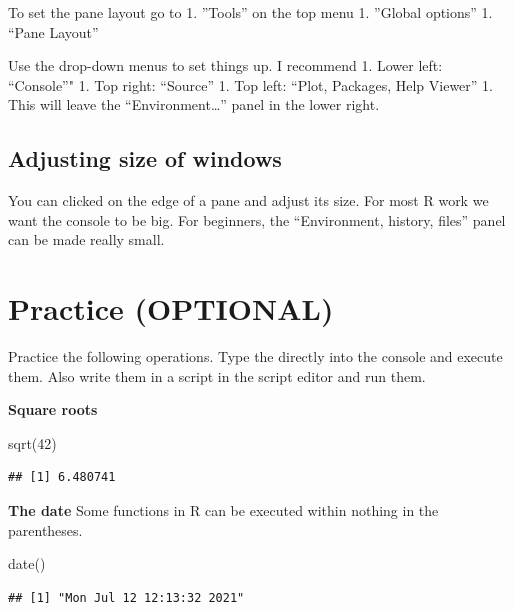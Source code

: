 \documentclass[
]{book}
\newenvironment{Shaded}{\begin{snugshade}}{\end{snugshade}}
\newcommand{\DecValTok}[1]{\textcolor[rgb]{0.00,0.00,0.81}{#1}}
\newcommand{\FunctionTok}[1]{\textcolor[rgb]{0.00,0.00,0.00}{#1}}
\newcommand{\NormalTok}[1]{#1}
\begin{document}
To set the pane layout go to
1. ''Tools'' on the top menu
1. ''Global options''
1. ``Pane Layout''

Use the drop-down menus to set things up. I recommend
1. Lower left: ``Console''"
1. Top right: ``Source''
1. Top left: ``Plot, Packages, Help Viewer''
1. This will leave the ``Environment\ldots{}'' panel in the lower right.

\hypertarget{adjusting-size-of-windows}{%
\subsection{Adjusting size of windows}\label{adjusting-size-of-windows}}

You can clicked on the edge of a pane and adjust its size. For most R work we want the console to be big. For beginners, the ``Environment, history, files'' panel can be made really small.

\hypertarget{practice-optional}{%
\section{Practice (OPTIONAL)}\label{practice-optional}}

Practice the following operations. Type the directly into the console and execute them. Also write them in a script in the script editor and run them.

\textbf{Square roots}

\begin{Shaded}
\begin{Highlighting}[]
\FunctionTok{sqrt}\NormalTok{(}\DecValTok{42}\NormalTok{)}
\end{Highlighting}
\end{Shaded}

\begin{verbatim}
## [1] 6.480741
\end{verbatim}

\textbf{The date}
Some functions in R can be executed within nothing in the parentheses.

\begin{Shaded}
\begin{Highlighting}[]
\FunctionTok{date}\NormalTok{()}
\end{Highlighting}
\end{Shaded}

\begin{verbatim}
## [1] "Mon Jul 12 12:13:32 2021"
\end{verbatim}
\end{document}
